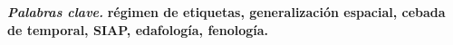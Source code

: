 \documentclass[conference,letterpaper]{IEEEtran}
\begin{document}
\smallskip
\noindent\textbf{\textit{Palabras clave.}} \bfseries régimen de etiquetas, generalización espacial, cebada de temporal,
SIAP, edafología, fenología.\par\mdseries










\end{document}

